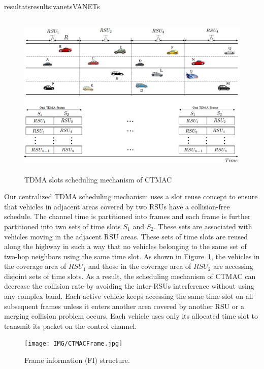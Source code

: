 \documentclass{ra2016}
\begin{document}
\begin{module}{resultats}{results:vanets}{VANETs}
  \begin{figure}[!h]
  \begin{center}
 \includegraphics[height=8cm,width=14cm]{IMG/CTMACprinciple.png}
 \caption{TDMA slots scheduling mechanism of CTMAC}
 \label{fig:CTSA}
  \end{center}
\end{figure}


Our centralized TDMA scheduling mechanism uses a slot reuse concept 
to ensure that vehicles in adjacent areas covered by two RSUs have 
a collision-free schedule. The channel time is partitioned into frames and
each frame is further partitioned into two sets of time slots $S_1$ and $S_2$. 
These sets are associated with vehicles moving in the adjacent RSU areas. 
These sets of time slots are reused along the highway in such a way that no vehicles belonging to 
the same set of two-hop 
neighbors using the same time slot. As shown in Figure~\ref{fig:CTSA}, the vehicles in 
the coverage area of $RSU_1$ and those in the coverage area of $RSU_2$ are
accessing disjoint sets of time slots. As a result, the scheduling mechanism of 
CTMAC can decrease the collision rate by avoiding the inter-RSUs interference 
without using any complex band.  Each active vehicle keeps accessing the same 
time slot on all subsequent frames unless it enters another area covered by another 
RSU or a merging collision problem occurs. Each vehicle uses only its allocated 
time slot to transmit its packet on the control channel.


  \begin{figure}[!h]
  \begin{center}
 \texttt{[image: IMG/CTMACFrame.jpg]}
  \caption{Frame information (FI) structure.}
 \label{fig:CTSA_FI}
  \end{center}
\end{figure}






\end{module}
\end{document}
